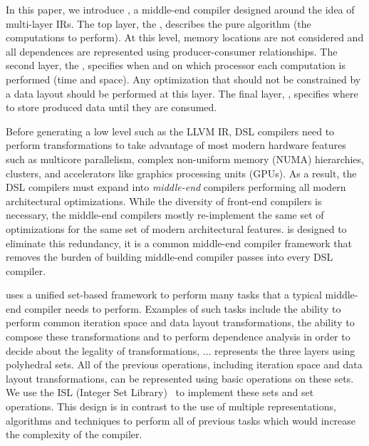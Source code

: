 In this paper, we introduce \framework{}, a middle-end compiler designed around the idea of multi-layer IRs.  The top layer, the {\it \Layerone}, describes the pure algorithm (the computations to perform). At this level, memory locations are not considered and all dependences are represented using producer-consumer relationships.  The second layer, the {\it \Layertwo}, specifies when and on which processor each computation is performed (time and space).  Any optimization that should not be constrained by a data layout should be performed at this layer.  The final layer, {\it \Layerthree}, specifies where to store produced data until they are consumed.

Before generating a low level such as the LLVM IR, DSL compilers need to perform transformations to take advantage of most modern hardware features such as multicore parallelism, complex non-uniform memory (NUMA) hierarchies, clusters, and accelerators like graphics processing units (GPUs). As a result, the DSL compilers must expand into {\it middle-end} compilers performing all modern architectural optimizations.  While the diversity of front-end compilers is necessary, the middle-end compilers mostly re-implement the same set of optimizations for the same set of modern architectural features.  \framework is designed to eliminate this redundancy, it is a common middle-end compiler framework that removes the burden of building middle-end compiler passes into every DSL compiler.

\framework{} uses a unified set-based framework to perform many tasks that a typical middle-end compiler needs to perform.
Examples of such tasks include the ability to perform common iteration space and data layout transformations, the ability to compose these transformations and to perform dependence analysis in order to decide about the legality of transformations, ...  
\framework{} represents the three layers using polyhedral sets.  All of the previous operations, including iteration space and data layout transformations, can be represented using basic operations on these sets.  We use the ISL (Integer Set Library)~\cite{verdoolaege_isl:_2010} to implement these sets and set operations.
This design is in contrast to the use of multiple representations, algorithms and techniques to perform all of previous tasks which would increase the complexity of the compiler.

